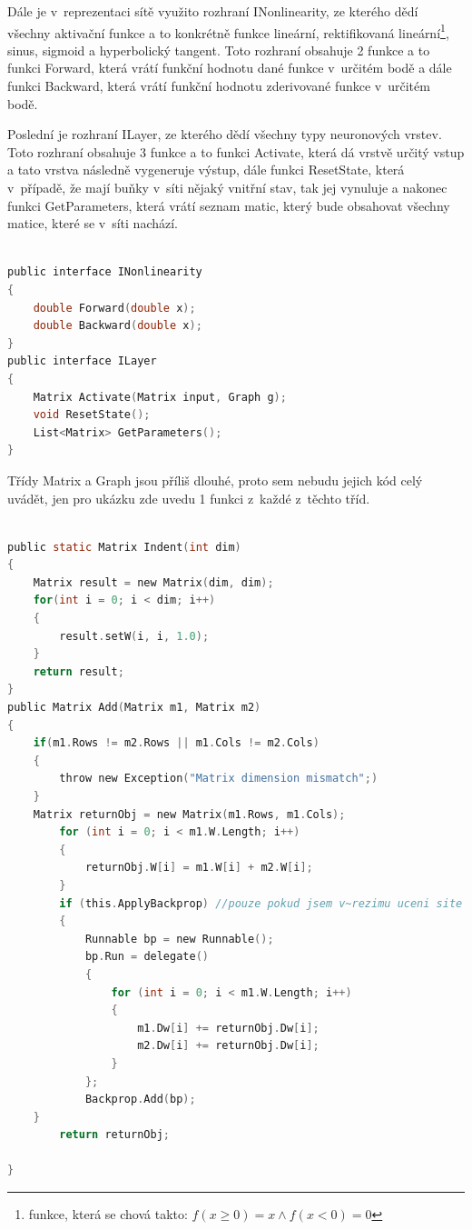 \documentclass[a4paper]{article}
\begin{document}
Dále je v~reprezentaci sítě využito rozhraní INonlinearity, ze kterého dědí všechny aktivační funkce a to konkrétně funkce lineární, rektifikovaná lineární\footnote{funkce, která se chová takto: $f(x \ge 0) = x \wedge f(x < 0) = 0$}, sinus, sigmoid a hyperbolický tangent. Toto rozhraní obsahuje 2 funkce a to funkci Forward, která vrátí funkční hodnotu dané funkce v~určitém bodě a dále funkci Backward, která vrátí funkční hodnotu zderivované funkce v~určitém bodě.\par
Poslední je rozhraní ILayer, ze kterého dědí všechny typy neuronových vrstev. Toto rozhraní obsahuje 3 funkce a to funkci Activate, která dá vrstvě určitý vstup a tato vrstva následně vygeneruje výstup, dále funkci ResetState, která v~případě, že mají buňky v~síti nějaký vnitřní stav, tak jej vynuluje a nakonec funkci GetParameters, která vrátí seznam matic, který bude obsahovat všechny matice, které se v~síti nachází.
\begin{lstlisting}[language=C, title={Ukázka rozhraní INonlinearity a ILayer}]

public interface INonlinearity
{
	double Forward(double x);
	double Backward(double x);
}
public interface ILayer
{
	Matrix Activate(Matrix input, Graph g);
	void ResetState();
	List<Matrix> GetParameters();
}
\end{lstlisting}
Třídy Matrix a Graph jsou příliš dlouhé, proto sem nebudu jejich kód celý uvádět, jen pro ukázku zde uvedu 1 funkci z~každé z~těchto tříd.
\begin{lstlisting}[language=C, title={Ukázka funkce Ident ze třídy Matrix a funkce Add ze třídy Graph}]

public static Matrix Indent(int dim)
{
	Matrix result = new Matrix(dim, dim);
	for(int i = 0; i < dim; i++)
	{
		result.setW(i, i, 1.0);
	}
	return result;
}
public Matrix Add(Matrix m1, Matrix m2)
{
	if(m1.Rows != m2.Rows || m1.Cols != m2.Cols)
	{
		throw new Exception("Matrix dimension mismatch";)
	}
	Matrix returnObj = new Matrix(m1.Rows, m1.Cols);
        for (int i = 0; i < m1.W.Length; i++)
        {
            returnObj.W[i] = m1.W[i] + m2.W[i];
        }
        if (this.ApplyBackprop) //pouze pokud jsem v~rezimu uceni site
        {
            Runnable bp = new Runnable();
            bp.Run = delegate()
            {
                for (int i = 0; i < m1.W.Length; i++)
                {
                    m1.Dw[i] += returnObj.Dw[i];
                    m2.Dw[i] += returnObj.Dw[i];
                }
            };
            Backprop.Add(bp);
    }
        return returnObj;

}
\end{lstlisting}
\end{document}
